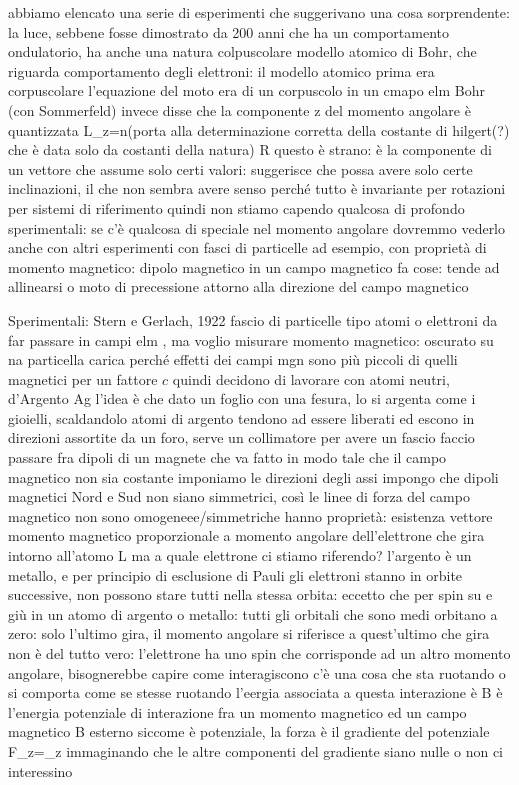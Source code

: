 \begin{itemize}
{{{{{{abbiamo elencato una serie di esperimenti che suggerivano una cosa sorprendente: la luce, sebbene fosse dimostrato da 200 anni che ha un comportamento ondulatorio, ha anche una natura colpuscolare
modello atomico di Bohr, che riguarda comportamento degli elettroni: il modello atomico prima era corpuscolare
l'equazione del moto era di un corpuscolo in un cmapo elm
Bohr (con Sommerfeld) invece disse che la componente z del momento angolare è quantizzata
	L_z=n\hslash \implies (porta alla determinazione corretta della costante di hilgert(?) che è data solo da costanti della natura) R
questo è strano: è la componente di un vettore che assume solo certi valori: suggerisce che possa avere solo certe inclinazioni, il che non sembra avere senso perché tutto è invariante per rotazioni per sistemi di riferimento
quindi non stiamo capendo qualcosa di profondo
sperimentali: se c'è qualcosa di speciale nel momento angolare dovremmo vederlo anche con altri esperimenti con fasci di particelle ad esempio, con proprietà di momento magnetico: dipolo magnetico in un campo magnetico fa cose: tende ad allinearsi o moto di precessione attorno alla direzione del campo magnetico

Sperimentali: Stern e Gerlach, 1922
fascio di particelle tipo atomi o elettroni da far passare in campi elm , ma voglio misurare momento magnetico: oscurato su na particella carica perché effetti dei campi mgn sono più piccoli di quelli magnetici per un fattore $c$
quindi decidono di lavorare con atomi neutri, d'Argento Ag
l'idea è che dato un foglio con una fesura, lo si argenta come i gioielli, scaldandolo atomi di argento tendono ad essere liberati ed escono in direzioni assortite da un foro, serve un collimatore per avere un fascio
faccio passare fra dipoli di un magnete che va fatto in modo tale che il campo magnetico non sia costante
imponiamo le direzioni degli assi
impongo che dipoli magnetici Nord e Sud non siano simmetrici, così le linee di forza del campo magnetico non sono omogeneee/simmetriche
hanno proprietà: esistenza vettore momento magnetico proporzionale a momento angolare dell'elettrone che gira intorno all'atomo
	\vba \mu\alpha\vba L 
ma a quale elettrone ci stiamo riferendo?
l'argento è un metallo, e per principio di esclusione di Pauli gli elettroni stanno in orbite successive, non possono stare tutti nella stessa orbita: eccetto che per spin su e giù
in un atomo di argento o metallo: tutti gli orbitali che sono medi orbitano a zero: solo l'ultimo gira, il momento angolare si riferisce a quest'ultimo che gira
non è del tutto vero: l'elettrone ha uno spin che corrisponde ad un altro momento angolare, bisognerebbe capire come interagiscono
c'è una cosa che sta ruotando o si comporta come se stesse ruotando
l'eergia associata a questa interazione è
	\vba \mu \rightarrow \vba \mu\vdot\vba B
	è l'energia potenziale di interazione fra un momento magnetico ed un campo magnetico \vba B esterno
siccome è potenziale, la forza è il gradiente del potenziale
	F_z=\mu_z
immaginando che le altre componenti del gradiente siano nulle o non ci interessino

}}}}}}
\end{itemize}
